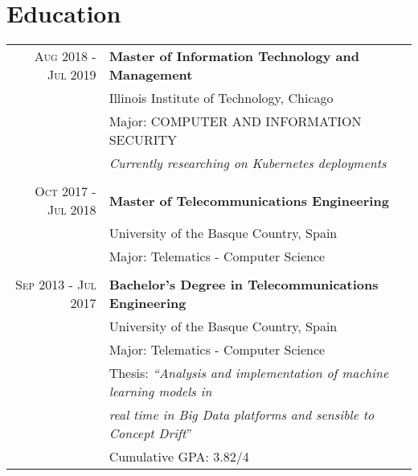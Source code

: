 \documentclass[a4paper,10pt]{article}
\begin{document}
\section{Education}
\begin{tabular}{rp{13.6cm}}

 \textsc{Aug 2018 - Jul 2019}& \textbf{Master of Information Technology and Management}\\
 & \footnotesize{Illinois Institute of Technology, Chicago} \\
 & Major: COMPUTER AND INFORMATION SECURITY \\ 
 & \emph{Currently researching on Kubernetes deployments} \\ &\\

 \textsc{Oct 2017 - Jul 2018}& \textbf{Master of Telecommunications Engineering}\\
 & \footnotesize{University of the Basque Country, Spain} \\
 & Major: Telematics - Computer Science \\&\\
 
 \textsc{Sep 2013 - Jul 2017}& \textbf{Bachelor's Degree in Telecommunications Engineering}\\
 & \footnotesize{University of the Basque Country, Spain} \\
 & Major: Telematics - Computer Science \\
 & Thesis: \emph{``Analysis and implementation of machine learning models in} \\
 & \hspace{12mm}\emph{ real time in Big Data platforms and sensible to Concept Drift}'' \\
& Cumulative \normalsize \textsc{GPA}: 3.82/4

\end{tabular}
\vspace{-.3in}


\end{document}
